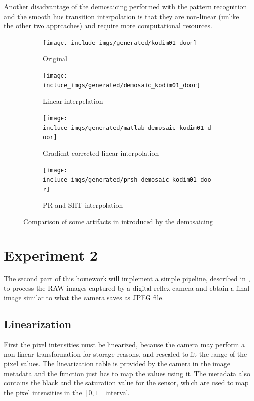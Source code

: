 \documentclass[a4paper,oneside]{article}
\begin{document}
Another disadvantage of the demosaicing performed with the pattern
recognition and the smooth hue transition interpolation is that they
are non-linear (unlike the other two approaches) and require more
computational resources.
\begin{figure}[htbp]
  \centering
  \begin{subfigure}{0.4\textwidth}
    \centering
    \texttt{[image: include\_imgs/generated/kodim01\_door]}
    \caption{Original}
  \end{subfigure}%
  \begin{subfigure}{0.4\textwidth}
    \centering
    \texttt{[image: include\_imgs/generated/demosaic\_kodim01\_door]}
    \caption{Linear interpolation}
  \end{subfigure}
  \begin{subfigure}{0.4\textwidth}
    \centering
    \texttt{[image: include\_imgs/generated/matlab\_demosaic\_kodim01\_door]}
    \caption{Gradient-corrected linear interpolation}
  \end{subfigure}%
  \begin{subfigure}{0.4\textwidth}
    \centering
    \texttt{[image: include\_imgs/generated/prsh\_demosaic\_kodim01\_door]}
    \caption{PR and SHT interpolation}
  \end{subfigure}
  \caption{Comparison of some artifacts in 
    introduced by the demosaicing}
  \label{fig:door}
\end{figure}

\section*{Experiment 2} 
The second part of this homework will implement a simple pipeline,
described in \cite{rawguide}, to process the RAW images captured by a
digital reflex camera and obtain a final image similar to what the
camera saves as JPEG file.

\subsection{Linearization}
First the pixel intensities must be linearized, because the camera may
perform a non-linear transformation for storage reasons, and rescaled
to fit the range of the pixel values. The linearization table is
provided by the camera in the image metadata and the
 function just has to map the values using
it. The metadata also contains the black and the saturation value for
the sensor, which are used to map the pixel intensities in the $[0,1]$
interval.
\end{document}
